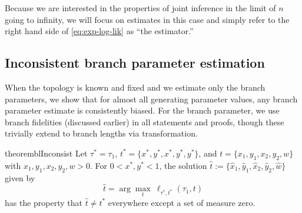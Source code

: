 \documentclass[11pt]{article}
\newcommand{\nCols}{n}
\begin{document}
Because we are interested in the properties of joint inference in the limit of $n$ going to infinity, we will focus on estimates in this case and simply refer to the right hand side of \eqref{eq:exp-log-lik} as ``the estimator.''


\subsection*{Inconsistent branch parameter estimation}
When the topology is known and fixed and we estimate only the branch parameters, we show that for almost all generating parameter values, any branch parameter estimate is consistently biased.
For the branch parameter, we use branch fidelities (discussed earlier) in all statements and proofs, though these trivially extend to branch lengths via transformation.

\begin{restatable}{theorem}{blInconsist}
\label{thm:bl_theorem}
Let $\tau^*=\tau_1$, $t^*=\{x^*, y^*, x^*, y^*, y^*\}$, and $t=\{x_1, y_1, x_2, y_2, w\}$ with $x_1, y_1, x_2, y_2, w > 0$.
For $0 < x^*, y^* < 1$, the solution $\hat{t} := \{\hat{x}_1,\hat{y}_1,\hat{x}_2,\hat{y}_2,\hat{w}\}$ given by
\[
\hat{t} = \arg\max_{t} \ \ell_{\tau^*,t^*}(\tau_1, t)
\]
has the property that $\hat{t} \neq t^*$ everywhere except a set of measure zero.
\end{restatable}
\end{document}
